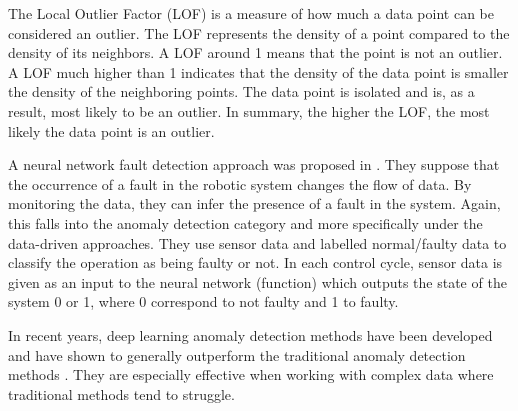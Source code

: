 The Local Outlier Factor (LOF) \cite{breunig2000lof} is a measure of how much a data point can be considered an outlier. The LOF represents the density of a point compared to the density of its neighbors. A LOF around 1 means that the point is not an outlier. A LOF much higher than 1 indicates that the density of the data point is smaller the density of the neighboring points. The data point is isolated and is, as a result, most likely to be an outlier. In summary, the higher the LOF, the most likely the data point is an outlier. 

A neural network fault detection approach was proposed in \cite{christensen2008faultDetection}. They suppose that the occurrence of a fault in the robotic system changes the flow of data. By monitoring the data, they can infer the presence of a fault in the system. Again, this falls into the anomaly detection category and more specifically under the data-driven approaches. They use sensor data and labelled normal/faulty data to classify the operation as being faulty or not. In each control cycle, sensor data is given as an input to the neural network (function) which outputs the state of the system {0 or 1}, where 0 correspond to not faulty and 1 to faulty. 

In recent years, deep learning anomaly detection methods have been developed and have shown to generally outperform the traditional anomaly detection methods \cite{pang2021deep}. They are especially effective when working with complex data where traditional methods tend to struggle.




